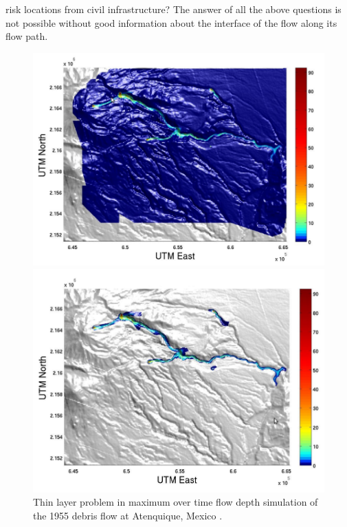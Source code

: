 \documentclass[letterpaper,10pt]{article}
\begin{document}
risk locations from civil infrastructure? 
The answer of all the above questions is not possible without good information about the interface of the flow along its flow path.
\begin{figure}[t]
  \begin{minipage}[b]{.45\linewidth}
    \centering
    \includegraphics[width=1\textwidth]{IMAGES/rupps1.png}
  \end{minipage}
\hspace{0.5cm}
  \begin{minipage}[b]{.45\linewidth}
    \centering
    \includegraphics[width=1\textwidth]{IMAGES/rupps2.png}
   \end{minipage}
  \caption{Thin layer problem in maximum over time flow depth simulation of the 1955 debris flow at Atenquique, Mexico \cite{Dalbey2009}.}
  \label{thinlayerproblem}
\end{figure}
\end{document}
